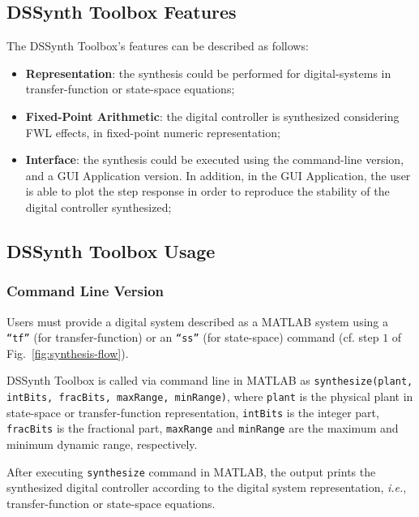 \documentclass[sigconf]{acmart}
\newcommand\tool{{DSSynth Toolbox}\xspace}
\begin{document}
\subsection{\tool Features}

The \tool's features can be described as follows:

\begin{itemize}
\item \textbf{Representation}: the synthesis could be performed for digital-systems in transfer-function or state-space equations;
\item \textbf{Fixed-Point Arithmetic}: the digital controller is synthesized considering FWL effects, in fixed-point numeric representation;
\item \textbf{Interface}: the synthesis could be executed using the command-line version, and a GUI Application version. In addition, in the GUI Application, the user is able to plot the step response in order to reproduce the stability of the digital controller synthesized;
\end{itemize}
\subsection{\tool Usage}

\subsubsection{Command Line Version}

Users must provide a digital system described as a MATLAB system  using a \texttt{``tf''} (for transfer-function) or an \texttt{``ss''} (for state-space) command (cf. step $1$ of Fig.~\ref{fig:synthesis-flow}).

\tool is called via command line in MATLAB as \texttt{synthesize(plant, intBits, fracBits, maxRange, minRange)}, where \texttt{plant} is the physical plant in state-space or transfer-function representation, \texttt{intBits} is the integer part, \texttt{fracBits} is the fractional part, \texttt{maxRange} and \texttt{minRange} are the maximum and minimum dynamic range, respectively.

After executing \texttt{synthesize} command in MATLAB, the output prints the synthesized digital controller according to the digital system representation, {\it i.e.}, transfer-function or state-space equations. 
\end{document}
